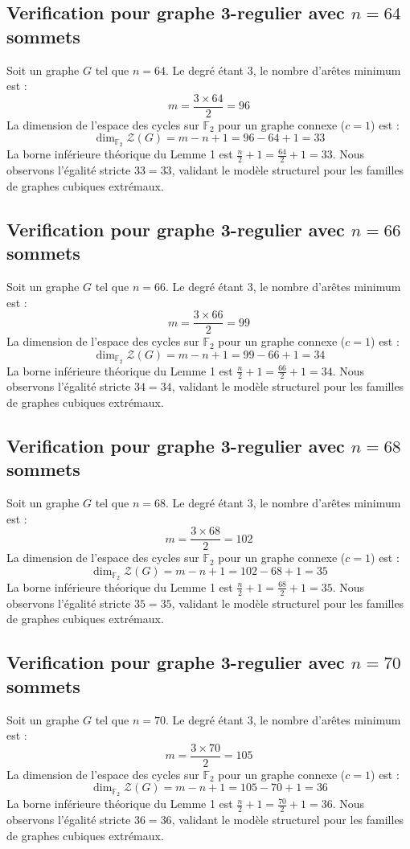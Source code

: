 \documentclass[11pt,a4paper]{article}
\begin{document}
\subsection{Verification pour graphe 3-regulier avec $n=64$ sommets}
Soit un graphe $G$ tel que $n = 64$. Le degré étant 3, le nombre d'arêtes minimum est :
$$ m = \frac{3 \times 64}{2} = 96 $$
La dimension de l'espace des cycles sur $\mathbb{F}_2$ pour un graphe connexe ($c=1$) est :
$$ \dim_{\mathbb{F}_2} \mathcal{Z}(G) = m - n + 1 = 96 - 64 + 1 = 33 $$
La borne inférieure théorique du Lemme 1 est $\frac{n}{2} + 1 = \frac{64}{2} + 1 = 33$.
Nous observons l'égalité stricte $33 = 33$, validant le modèle structurel pour les familles de graphes cubiques extrémaux.

\subsection{Verification pour graphe 3-regulier avec $n=66$ sommets}
Soit un graphe $G$ tel que $n = 66$. Le degré étant 3, le nombre d'arêtes minimum est :
$$ m = \frac{3 \times 66}{2} = 99 $$
La dimension de l'espace des cycles sur $\mathbb{F}_2$ pour un graphe connexe ($c=1$) est :
$$ \dim_{\mathbb{F}_2} \mathcal{Z}(G) = m - n + 1 = 99 - 66 + 1 = 34 $$
La borne inférieure théorique du Lemme 1 est $\frac{n}{2} + 1 = \frac{66}{2} + 1 = 34$.
Nous observons l'égalité stricte $34 = 34$, validant le modèle structurel pour les familles de graphes cubiques extrémaux.

\subsection{Verification pour graphe 3-regulier avec $n=68$ sommets}
Soit un graphe $G$ tel que $n = 68$. Le degré étant 3, le nombre d'arêtes minimum est :
$$ m = \frac{3 \times 68}{2} = 102 $$
La dimension de l'espace des cycles sur $\mathbb{F}_2$ pour un graphe connexe ($c=1$) est :
$$ \dim_{\mathbb{F}_2} \mathcal{Z}(G) = m - n + 1 = 102 - 68 + 1 = 35 $$
La borne inférieure théorique du Lemme 1 est $\frac{n}{2} + 1 = \frac{68}{2} + 1 = 35$.
Nous observons l'égalité stricte $35 = 35$, validant le modèle structurel pour les familles de graphes cubiques extrémaux.

\subsection{Verification pour graphe 3-regulier avec $n=70$ sommets}
Soit un graphe $G$ tel que $n = 70$. Le degré étant 3, le nombre d'arêtes minimum est :
$$ m = \frac{3 \times 70}{2} = 105 $$
La dimension de l'espace des cycles sur $\mathbb{F}_2$ pour un graphe connexe ($c=1$) est :
$$ \dim_{\mathbb{F}_2} \mathcal{Z}(G) = m - n + 1 = 105 - 70 + 1 = 36 $$
La borne inférieure théorique du Lemme 1 est $\frac{n}{2} + 1 = \frac{70}{2} + 1 = 36$.
Nous observons l'égalité stricte $36 = 36$, validant le modèle structurel pour les familles de graphes cubiques extrémaux.
\end{document}
